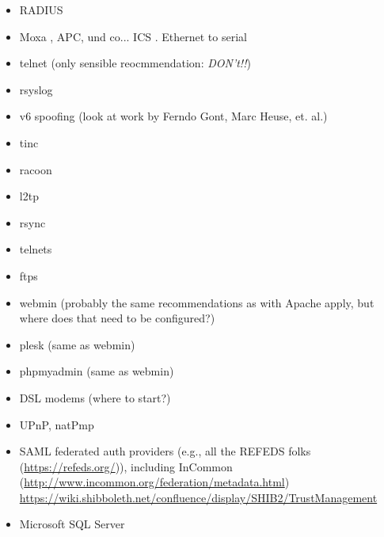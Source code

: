 \begin{minipage}[b]{0.5\linewidth}
\begin{itemize}
\item RADIUS 
\item Moxa , APC, und co... ICS . Ethernet to serial 
\item telnet (only sensible reocmmendation: \emph{DON't!!})
\item rsyslog 
\item v6 spoofing (look at work by Ferndo Gont, Marc Heuse, et. al.)
\item tinc
\item racoon
\item l2tp
\item rsync 
\item telnets 
\item ftps 
\item webmin (probably the same recommendations as with Apache apply, but where does that need to be configured?)
\item plesk (same as webmin)
\item phpmyadmin (same as webmin)
\item DSL modems (where to start?)
\item UPnP, natPmp 
\item SAML federated auth providers (e.g., all the REFEDS folks (\url{https://refeds.org/})), including InCommon (\url{http://www.incommon.org/federation/metadata.html})
  \url{https://wiki.shibboleth.net/confluence/display/SHIB2/TrustManagement} 
\item Microsoft SQL Server
\end{itemize}
\end{minipage}





